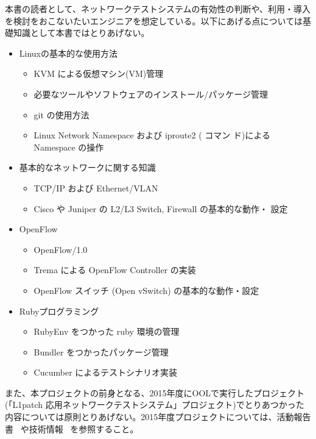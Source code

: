 本書の読者として、ネットワークテストシステムの有効性の判断や、利用・導入
を検討をおこないたいエンジニアを想定している。以下にあげる点については基
礎知識として本書ではとりあげない。

\begin{itemize}
 \item Linuxの基本的な使用方法
       \begin{itemize}
        \item KVM による仮想マシン(VM)管理
        \item 必要なツールやソフトウェアのインストール/パッケージ管理
        \item git の使用方法
        \item Linux Network Namespace および iproute2 (  コマン
              ド)によるNamespace の操作
       \end{itemize}
 \item 基本的なネットワークに関する知識
       \begin{itemize}
        \item TCP/IP および Ethernet/VLAN
        \item Cisco や Juniper の L2/L3 Switch, Firewall の基本的な動作・
              設定
       \end{itemize}
 \item OpenFlow
       \begin{itemize}
        \item OpenFlow/1.0
        \item Trema による OpenFlow Controller の実装
        \item OpenFlow スイッチ (Open vSwitch) の基本的な動作・設定
       \end{itemize}
 \item Rubyプログラミング
       \begin{itemize}
        \item RubyEnv をつかった ruby 環境の管理
        \item Bundler をつかったパッケージ管理
        \item Cucumber によるテストシナリオ実装
       \end{itemize}
\end{itemize}

また、本プロジェクトの前身となる、2015年度にOOLで実行したプロジェクト
(「L1patch 応用ネットワークテストシステム」プロジェクト)でとりあつかった
内容については原則とりあげない。2015年度プロジェクトについては、活動報告
書~\cite{l1pjpoc} や技術情報~\cite{l1pjtech} を参照すること。

